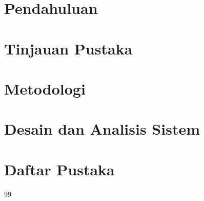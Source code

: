 \documentclass[12pt,a4paper]{book}
\begin{document}
\chapter{Pendahuluan}


\chapter{Tinjauan Pustaka}


\chapter{Metodologi}


\chapter{Desain dan Analisis Sistem}


\chapter*{Daftar Pustaka}

\begin{thebibliography}{99}
\setlength{\itemsep}{0.2cm}



\end{thebibliography}
\end{document}
